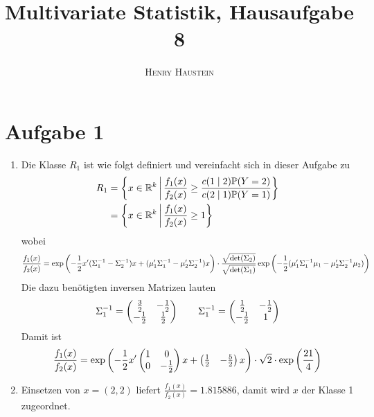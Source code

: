 \documentclass{article}
\title{\textbf{Multivariate Statistik, Hausaufgabe 8}}
\author{\textsc{Henry Haustein}}
\date{}
\begin{document}
	\maketitle
	
	\section*{Aufgabe 1}
	\begin{enumerate}[label=(\alph*)]
		\item Die Klasse $R_1$ ist wie folgt definiert und vereinfacht sich in dieser Aufgabe zu
		\begin{align}
			R_1 &= \left\lbrace x\in \mathbb{R}^k\,\bigg\vert\, \frac{f_1(x)}{f_2(x)} \ge \frac{c(1\mid 2)\mathbb{P}(Y=2)}{c(2\mid 1)\mathbb{P}(Y=1)}\right\rbrace \notag \\
			&= \left\lbrace x\in \mathbb{R}^k\,\bigg\vert\, \frac{f_1(x)}{f_2(x)} \ge 1\right\rbrace \notag
		\end{align}
		wobei
		\begin{align}
			\frac{f_1(x)}{f_2(x)} = \exp\left(-\frac{1}{2}x'(\Sigma_1^{-1}-\Sigma_2^{-1})x + (\mu_1'\Sigma_1^{-1} - \mu_2'\Sigma_2^{-1})x\right) \cdot\frac{\sqrt{\det(\Sigma_2)}}{\sqrt{\det(\Sigma_1)}}\exp\left(-\frac{1}{2}(\mu_1'\Sigma_1^{-1}\mu_1 - \mu_2'\Sigma_2^{-1}\mu_2)\right) \notag
		\end{align}
		Die dazu benötigten inversen Matrizen lauten
		\begin{align}
			\Sigma_1^{-1} = \begin{pmatrix}
				\frac{3}{2} & -\frac{1}{2} \\ -\frac{1}{2} & \frac{1}{2}
			\end{pmatrix} \qquad \Sigma_1^{-1} = \begin{pmatrix}
				\frac{1}{2} & -\frac{1}{2} \\ -\frac{1}{2} & 1
			\end{pmatrix} \notag
		\end{align}
		Damit ist
		\begin{align}
			\frac{f_1(x)}{f_2(x)} = \exp\left(-\frac{1}{2}x'\begin{pmatrix}1 & 0 \\ 0 & -\frac{1}{2}\end{pmatrix}x + \begin{pmatrix}\frac{1}{2} & -\frac{5}{2}\end{pmatrix}x\right) \cdot\sqrt{2}\cdot\exp\left(\frac{21}{4}\right) \notag
		\end{align}
		\item Einsetzen von $x=(2,2)$ liefert $\frac{f_1(x)}{f_2(x)}=1.815886$, damit wird $x$ der Klasse 1 zugeordnet.

\end{enumerate}
\end{document}
